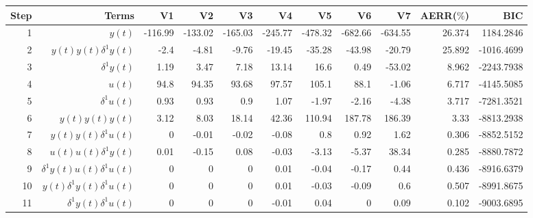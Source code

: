 \begin{tabular}{rrrrrrrrrrr}
Step & Terms & V1 & V2 & V3 & V4 & V5 & V6 & V7 & AERR($\%$) & BIC \\ 
\hline 
1 & $y(t)$ & -116.99 & -133.02 & -165.03 & -245.77 & -478.32 & -682.66 & -634.55 & 26.374 & 1184.2846 \\ 
2 & $y(t)y(t)\delta^1 y(t)$ & -2.4 & -4.81 & -9.76 & -19.45 & -35.28 & -43.98 & -20.79 & 25.892 & -1016.4699 \\ 
3 & $\delta^1 y(t)$ & 1.19 & 3.47 & 7.18 & 13.14 & 16.6 & 0.49 & -53.02 & 8.962 & -2243.7938 \\ 
4 & $u(t)$ & 94.8 & 94.35 & 93.68 & 97.57 & 105.1 & 88.1 & -1.06 & 6.717 & -4145.5085 \\ 
5 & $\delta^1 u(t)$ & 0.93 & 0.93 & 0.9 & 1.07 & -1.97 & -2.16 & -4.38 & 3.717 & -7281.3521 \\ 
6 & $y(t)y(t)y(t)$ & 3.12 & 8.03 & 18.14 & 42.36 & 110.94 & 187.78 & 186.39 & 3.33 & -8813.2938 \\ 
7 & $y(t)y(t)\delta^1 u(t)$ & 0 & -0.01 & -0.02 & -0.08 & 0.8 & 0.92 & 1.62 & 0.306 & -8852.5152 \\ 
8 & $u(t)u(t)\delta^1 y(t)$ & 0.01 & -0.15 & 0.08 & -0.03 & -3.13 & -5.37 & 38.34 & 0.285 & -8880.7872 \\ 
9 & $\delta^1 y(t)u(t)\delta^1 u(t)$ & 0 & 0 & 0 & 0.01 & -0.04 & -0.17 & 0.44 & 0.436 & -8916.6379 \\ 
10 & $y(t)\delta^1 y(t)\delta^1 u(t)$ & 0 & 0 & 0 & 0.01 & -0.03 & -0.09 & 0.6 & 0.507 & -8991.8675 \\ 
11 & $\delta^1 y(t)\delta^1 u(t)$ & 0 & 0 & 0 & -0.01 & 0.04 & 0 & 0.09 & 0.102 & -9003.6895 \\ 
\hline 
\end{tabular}